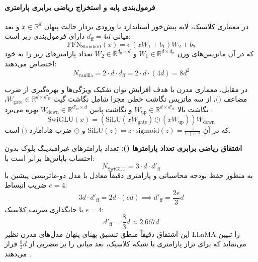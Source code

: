 \paragraph*{فرمول‌بندی پایه و استخراج ریاضی برابری پارامتری }
در معماری کلاسیک، لایه پیش‌خور استاندارد با ورودی بردار حالت پنهان $x \in \mathbb{R}^d$ و بعد میانی $d_{\text{ff}} = 4d$ دارای فرمول‌بندی زیر است:
\begin{equation}
    \text{FFN}_{\text{Standard}}(x) = \sigma(x W_1 + b_1) W_2 + b_2
\end{equation}
که در آن ماتریس‌های وزن $W_1 \in \mathbb{R}^{d \times d_{\text{ff}}}$ و $W_2 \in \mathbb{R}^{d_{\text{ff}} \times d}$ تعداد پارامترهای زیر را به خود اختصاص می‌دهند:
\begin{equation}
    N_{\text{vanilla}} = 2 \cdot d \cdot d_{\text{ff}} = 2 \cdot d \cdot (4d) = 8d^2
\end{equation}

در مقابل، معماری مدرن  با هدف افزایش توان تفکیک ویژگی‌ها و بهره‌گیری از ضرب مضاعف ()، از سه ماتریس نگاشت خطی مجزا شامل نگاشت گیت $W_{\text{gate}} \in \mathbb{R}^{d \times d'_{\text{ff}}}$، نگاشت بالا $W_{\text{up}} \in \mathbb{R}^{d \times d'_{\text{ff}}}$ و نگاشت پایین $W_{\text{down}} \in \mathbb{R}^{d'_{\text{ff}} \times d}$ بهره می‌برد \cite{shazeer2020glu}:
\begin{equation}
    \text{SwiGLU}(x) = \left( \text{SiLU}(x W_{\text{gate}}) \odot (x W_{\text{up}}) \right) W_{\text{down}}
\end{equation}
که در آن $\text{SiLU}(z) = z \cdot \text{sigmoid}(z) = \frac{z}{1 + e^{-z}}$ و $\odot$ ضرب هادامارد () است.

\textbf{اشتقاق ریاضی برابری تعداد پارامترها ():}
تعداد پارامترهای غیرامبدینگ بلوک  بدون احتساب بایاس‌ها برابر است با:
\begin{equation}
    N_{\text{SwiGLU}} = 3 \cdot d \cdot d'_{\text{ff}}
\end{equation}
به منظور حفظ بودجه محاسباتی و پارامتری دقیقاً معادل با مدل دو-ماتریسی پیشین با ضریب انبساط $e = 4$:
\begin{equation}
    3 d \cdot d'_{\text{ff}} = 2 d \cdot (e d) \implies d'_{\text{ff}} = \frac{2e}{3} d
\end{equation}
با جایگذاری ضریب کلاسیک $e = 4$:
\begin{equation}
    d'_{\text{ff}} = \frac{8}{3}d \approx 2.667d
\end{equation}
این اشتقاق دقیقاً منطق تنسیق پهنای پنهان مدل‌های مدرن نظیر LLaMA را تبیین می‌نماید که برای تراز پارامتری با شبکه کلاسیک، بعد میانی را بر مضربی از $\frac{8}{3}d$ قرار می‌دهند \cite{tan2025crystallization, touvron2023llama}.

